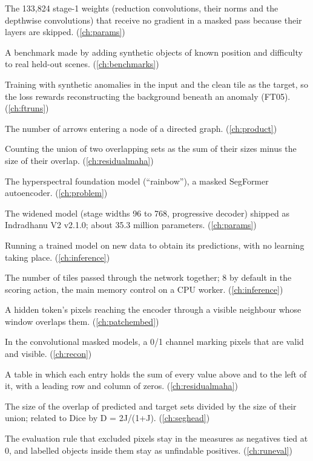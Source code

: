\begin{description}[style=nextline,leftmargin=1.2em,font=\normalfont\bfseries]
\item[Idle parameters] The 133,824 stage-1 weights (reduction convolutions, their norms and the depthwise convolutions) that receive no gradient in a masked pass because their layers are skipped. (\cref{ch:params})
\item[Implant bench] A benchmark made by adding synthetic objects of known position and difficulty to real held-out scenes. (\cref{ch:benchmarks})
\item[Implant-denoising] Training with synthetic anomalies in the input and the clean tile as the target, so the loss rewards reconstructing the background beneath an anomaly (FT05). (\cref{ch:ftruns})
\item[In-degree] The number of arrows entering a node of a directed graph. (\cref{ch:product})
\item[Inclusion-exclusion] Counting the union of two overlapping sets as the sum of their sizes minus the size of their overlap. (\cref{ch:residualmaha})
\item[Indradhanu] The hyperspectral foundation model (``rainbow''), a masked SegFormer autoencoder. (\cref{ch:problem})
\item[Indradhanu Heavy] The widened model (stage widths 96 to 768, progressive decoder) shipped as Indradhanu V2 v2.1.0; about 35.3 million parameters. (\cref{ch:params})
\item[Inference] Running a trained model on new data to obtain its predictions, with no learning taking place. (\cref{ch:inference})
\item[Inference batch size] The number of tiles passed through the network together; 8 by default in the scoring action, the main memory control on a CPU worker. (\cref{ch:inference})
\item[Information leakage] A hidden token's pixels reaching the encoder through a visible neighbour whose window overlaps them. (\cref{ch:patchembed})
\item[Input mask] In the convolutional masked models, a 0/1 channel marking pixels that are valid and visible. (\cref{ch:recon})
\item[Integral image] A table in which each entry holds the sum of every value above and to the left of it, with a leading row and column of zeros. (\cref{ch:residualmaha})
\item[Intersection over union] The size of the overlap of predicted and target sets divided by the size of their union; related to Dice by D = 2J/(1+J). (\cref{ch:seghead})
\item[Invariant 7] The evaluation rule that excluded pixels stay in the measures as negatives tied at 0, and labelled objects inside them stay as unfindable positives. (\cref{ch:runeval})

\end{description}
